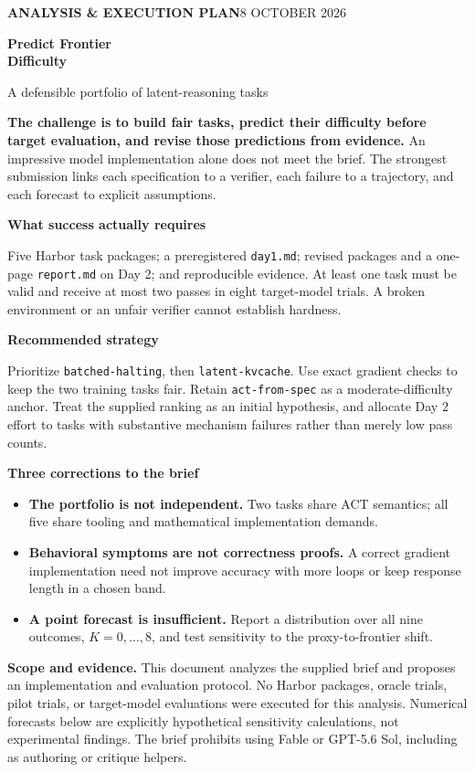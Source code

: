 \documentclass[11pt,a4paper]{article}
\newcommand{\sub}[1]{\vspace{4pt}\textbf{#1}\par}
\newcommand{\code}[1]{\texttt{#1}}
\begin{document}
\thispagestyle{empty}
{\small\color{accent}\textbf{ANALYSIS \& EXECUTION PLAN}\hfill 8 OCTOBER 2026}
\vspace{15mm}

{\Huge\bfseries Predict Frontier\\[3pt] Difficulty}
\vspace{4mm}

{\Large\color{muted}A defensible portfolio of latent-reasoning tasks}
\vspace{8mm}

\textbf{The challenge is to build fair tasks, predict their difficulty before target evaluation, and revise those predictions from evidence.} An impressive model implementation alone does not meet the brief. The strongest submission links each specification to a verifier, each failure to a trajectory, and each forecast to explicit assumptions.

\sub{What success actually requires}
Five Harbor task packages; a preregistered \code{day1.md}; revised packages and a one-page \code{report.md} on Day 2; and reproducible evidence. At least one task must be valid and receive at most two passes in eight target-model trials. A broken environment or an unfair verifier cannot establish hardness.

\sub{Recommended strategy}
Prioritize \code{batched-halting}, then \code{latent-kvcache}. Use exact gradient checks to keep the two training tasks fair. Retain \code{act-from-spec} as a moderate-difficulty anchor. Treat the supplied ranking as an initial hypothesis, and allocate Day 2 effort to tasks with substantive mechanism failures rather than merely low pass counts.

\sub{Three corrections to the brief}
\begin{itemize}
\item \textbf{The portfolio is not independent.} Two tasks share ACT semantics; all five share tooling and mathematical implementation demands.
\item \textbf{Behavioral symptoms are not correctness proofs.} A correct gradient implementation need not improve accuracy with more loops or keep response length in a chosen band.
\item \textbf{A point forecast is insufficient.} Report a distribution over all nine outcomes, $K=0,\ldots,8$, and test sensitivity to the proxy-to-frontier shift.
\end{itemize}

\vfill
{\small\color{muted}\textbf{Scope and evidence.} This document analyzes the supplied brief and proposes an implementation and evaluation protocol. No Harbor packages, oracle trials, pilot trials, or target-model evaluations were executed for this analysis. Numerical forecasts below are explicitly hypothetical sensitivity calculations, not experimental findings. The brief prohibits using Fable or GPT-5.6 Sol, including as authoring or critique helpers.}
\end{document}
